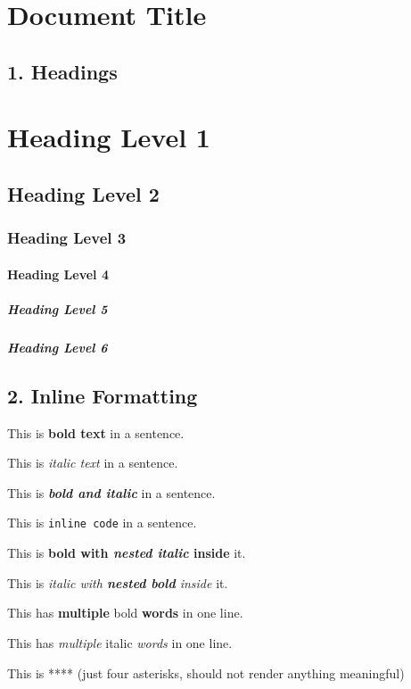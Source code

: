 \documentclass{article}
\begin{document}
\section{ Document Title}

\subsection{ 1. Headings}

\section{ Heading Level 1}

\subsection{ Heading Level 2}

\subsubsection{ Heading Level 3}

\paragraph{ Heading Level 4}

\subparagraph{ Heading Level 5}

\subparagraph{ Heading Level 6}

\subsection{ 2. Inline Formatting}

This is \textbf{bold text} in a sentence.

This is \emph{italic text} in a sentence.

This is \textbf{\emph{bold and italic}} in a sentence.

This is \texttt{inline code} in a sentence.

This is \textbf{bold with \emph{nested italic} inside} it.

This is \emph{italic with \textbf{nested bold} inside} it.

This has \textbf{multiple} bold \textbf{words} in one line.

This has \emph{multiple} italic \emph{words} in one line.

This is **** (just four asterisks, should not render anything meaningful)
\end{document}
